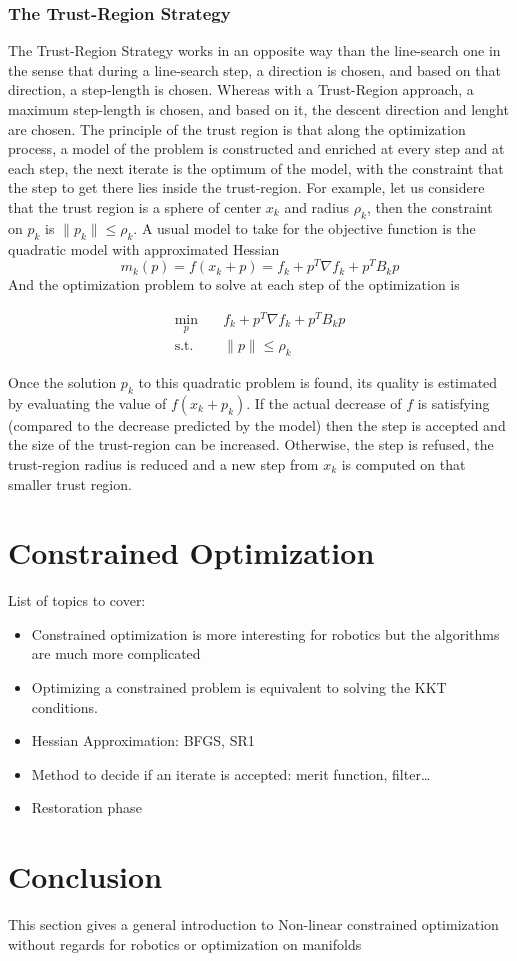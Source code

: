 \subsubsection{The Trust-Region Strategy}
The Trust-Region Strategy works in an opposite way than the line-search one in
the sense that during a line-search step, a direction is chosen, and based on
that direction, a step-length is chosen. Whereas with a Trust-Region approach, a
maximum step-length is chosen, and based on it, the descent direction and lenght
are chosen.
The principle of the trust region is that along the optimization process, a
model of the problem is constructed and enriched at every step and at each step,
the next iterate is the optimum of the model, with the constraint that the step
to get there lies inside the trust-region. For example, let us considere that
the trust region is a sphere of center $x_k$ and radius $\rho_k$, then the
constraint on $p_k$ is $\|p_k\| \leq \rho_k$. A usual model to take for the
objective function is the quadratic model with approximated Hessian
\begin{equation}
  m_k(p) = f(x_k+p) = f_k + p^T\nabla f_k + p^TB_k p
\end{equation}
And the optimization problem to solve at each step of the optimization is

\begin{align}
  \min_{p} & \quad f_k + p^T\nabla f_k + p^TB_k p \nonumber\\
\text{s.t.}&
\quad \|p\| \leq \rho_k
\label{eq:trustRegion}
\end{align}

Once the solution $p_k$ to this quadratic problem is found, its quality is
estimated by evaluating the value of $f(x_k+p_k)$. If the actual decrease of $f$
is satisfying (compared to the decrease predicted by the model) then the step is
accepted and the size of the trust-region can be increased. Otherwise, the step
is refused, the trust-region radius is reduced and a new step from $x_k$ is
computed on that smaller trust region.

\section{Constrained Optimization}

List of topics to cover:
\begin{itemize}
  \item Constrained optimization is more interesting for robotics but the algorithms are much more complicated
  \item Optimizing a constrained problem is equivalent to solving the KKT conditions.
  \item Hessian Approximation: BFGS, SR1
  \item Method to decide if an iterate is accepted: merit function, filter\dots
  \item Restoration phase
\end{itemize}

\section{Conclusion}
This section gives a general introduction to Non-linear constrained optimization without regards for robotics or optimization on manifolds


